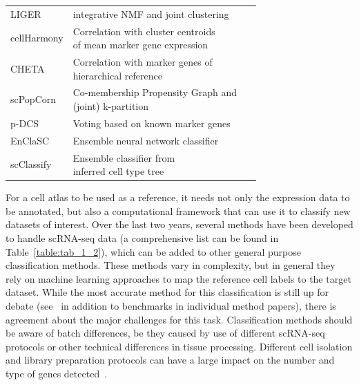 \begin{table}[p]
\begin{tabular}{l|l|c}
LIGER & integrative NMF and joint clustering & ~\citep{welch_single-cell_2019}\\

cellHarmony & \specialcell[t]{Correlation with cluster centroids\\of mean marker gene expression} & ~\citep{depasquale_cellharmony:_2019}\\

CHETA & \specialcell[t]{Correlation with marker genes of\\hierarchical reference} & ~\citep{de_kanter_chetah:_2019}\\

scPopCorn & \specialcell[t]{Co-membership Propensity Graph and\\(joint) k-partition} & ~\citep{wang_subpopulation_2019}\\

p-DCS & Voting based on known marker genes & ~\citep{domanskyi_polled_2019}\\

EnClaSC & Ensemble neural network classifier & ~\citep{chen_enclasc:_2019}\\

scClassify & \specialcell[t]{Ensemble classifier from\\inferred cell type tree} & ~\citep{lin_scclassify:_2019}\\

\bottomrule
\end{tabular}
\end{table}

For a cell atlas to be used as a reference, it needs not only the expression data to be annotated, but also a computational framework that can use it to classify new datasets of interest. Over the last two years, several methods have been developed to handle scRNA-seq data (a comprehensive list can be found in Table~\ref{table:tab_1_2}), which can be added to other general purpose classification methods. These methods vary in complexity, but in general they rely on machine learning approaches to map the reference cell labels to the target dataset. While the most accurate method for this classification is still up for debate (see~\citep{abdelaal_comparison_2019,kohler_deep_2019} in addition to benchmarks in individual method papers), there is agreement about the major challenges for this task. Classification methods should be aware of batch differences, be they caused by use of different scRNA-seq protocols or other technical differences in tissue processing. Different cell isolation and library preparation protocols can have a large impact on the number and type of genes detected~\citep{mereu_benchmarking_2019}.

